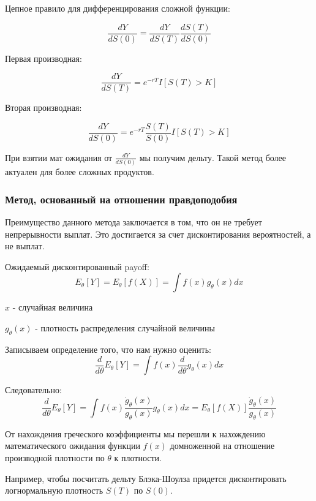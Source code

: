 \documentclass{article}
\begin{document}
Цепное правило для дифференцирования сложной функции:

\[\frac{dY}{dS(0)} = \frac{dY}{dS(T)}\frac{dS(T)}{dS(0)}\]

Первая производная:

\[\frac{dY}{dS(T)} = e^{-rT}I[S(T)>K]\]

Вторая производная:

\[\frac{dY}{dS(0)} = e^{-rT}\frac{S(T)}{S(0)}I[S(T)>K]\]

При взятии мат ожидания от \(\frac{dY}{dS(0)}\) мы получим дельту. Такой метод более актуален для более сложных продуктов.
\subsubsection{Метод, основанный на отношении правдоподобия}
Преимущество данного метода заключается в том, что он не требует непрерывности выплат. Это достигается за счет дисконтирования вероятностей, а не выплат.

Ожидаемый дисконтированный payoff:
\[E_\theta[Y] = E_\theta[f(X)] = \int f(x)g_\theta(x)dx\]

$x$ - случайная величина

$g_\theta(x)$ - плотность распределения случайной величины
\newline

Записываем определение того, что нам нужно оценить:
\[\frac{d}{d\theta}E_\theta[Y] = \int f(x)\frac{d}{d\theta}g_\theta(x)dx\]

Следовательно:
\[\frac{d}{d\theta}E_\theta[Y] = \int f(x)\frac{\dot{g}_\theta(x)}{g_\theta(x)}g_\theta(x)dx = E_\theta[f(X)]\frac{\dot{g}_\theta(x)}{g_\theta(x)}\]

От нахождения греческого коэффициенты мы перешли к нахождению математического ожидания функции $f(x)$ домноженной на отношение производной плотности по $\theta$ к плотности.

Например, чтобы посчитать дельту Блэка-Шоулза придется дисконтировать логнормальную плотность $S(T)$ по $S(0)$.
\end{document}
